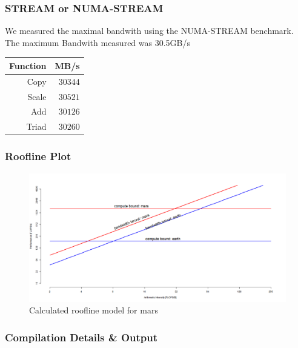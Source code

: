 \subsubsection{STREAM or NUMA-STREAM}

We measured the maximal bandwith using the NUMA-STREAM benchmark.
The maximum Bandwith measured was 30.5GB/s

\begin{center}
\begin{tabular}{|r|r|}
	\hline
	Function & MB/s    \\ \hline
	Copy     & $30344$ \\ \hline
	Scale    & $30521$ \\ \hline
	Add      & $30126$ \\ \hline
	Triad    & $30260$ \\ \hline
\end{tabular}
\end{center}

\subsubsection{Roofline Plot}

\begin{figure}[]
	\centering
	\includegraphics[width=.5\linewidth]{figures/placeholder}
	\caption{Calculated roofline model for mars}
	\label{fig:runtime}
\end{figure}

\newpage
\subsubsection{Compilation Details \& Output}

